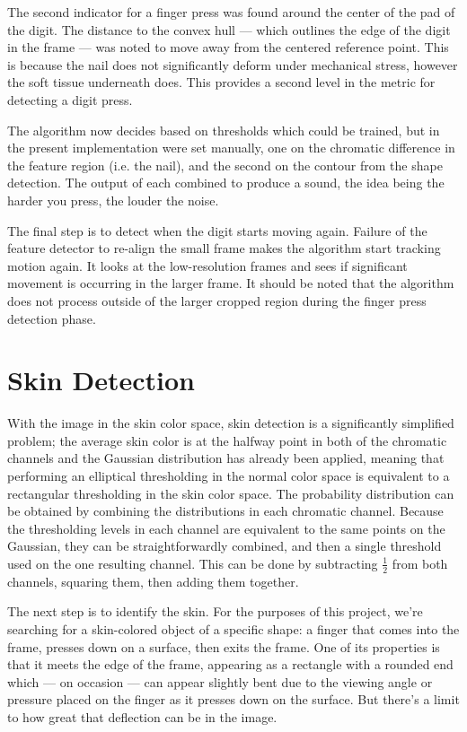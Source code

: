 The second indicator for a finger press was found around the center of the pad of the digit. The distance to the convex hull --- which outlines the edge of the digit in the frame --- was noted to move away from the centered reference point. This is because the nail does not significantly deform under mechanical stress, however the soft tissue underneath does. This provides a second level in the metric for detecting a digit press.

The algorithm now decides based on thresholds which could be trained, but in the present implementation were set manually, one on the chromatic difference in the feature region (i.e. the nail), and the second on the contour from the shape detection. The output of each combined to produce a sound, the idea being the harder you press, the louder the noise.

The final step is to detect when the digit starts moving again. Failure of the feature detector to re-align the small frame makes the algorithm start tracking motion again. It looks at the low-resolution frames and sees if significant movement is occurring in the larger frame. It should be noted that the algorithm does not process outside of the larger cropped region during the finger press detection phase.

\section{Skin Detection}\label{sec:SkinDetection}

With the image in the skin color space, skin detection is a significantly simplified problem; the average skin color is at the halfway point in both of the chromatic channels and the Gaussian distribution has already been applied, meaning that performing an elliptical thresholding in the normal color space is equivalent to a rectangular thresholding in the skin color space. The probability distribution can be obtained by combining the distributions in each chromatic channel. Because the thresholding levels in each channel are equivalent to the same points on the Gaussian, they can be straightforwardly combined, and then a single threshold used on the one resulting channel. This can be done by subtracting $\frac{1}{2}$ from both channels, squaring them, then adding them together.

The next step is to identify the skin. For the purposes of this project, we're searching for a skin-colored object of a specific shape: a finger that comes into the frame, presses down on a surface, then exits the frame. One of its properties is that it meets the edge of the frame, appearing as a rectangle with a rounded end which --- on occasion --- can appear slightly bent due to the viewing angle or pressure placed on the finger as it presses down on the surface. But there's a limit to how great that deflection can be in the image.

